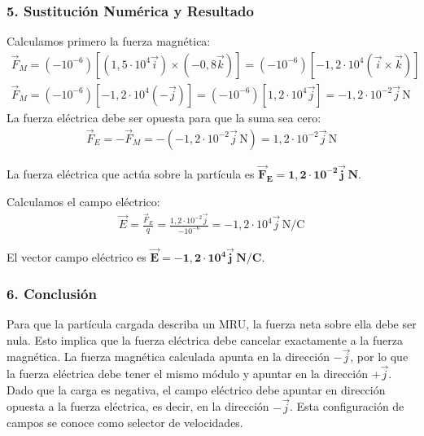 \subsubsection*{5. Sustitución Numérica y Resultado}
Calculamos primero la fuerza magnética:
\begin{gather}
    \vec{F}_M = (-10^{-6}) \left[ (1,5 \cdot 10^4 \vec{i}) \times (-0,8 \vec{k}) \right] = (-10^{-6}) [ -1,2 \cdot 10^4 (\vec{i} \times \vec{k}) ] \nonumber \\
    \vec{F}_M = (-10^{-6}) [ -1,2 \cdot 10^4 (-\vec{j}) ] = (-10^{-6}) [ 1,2 \cdot 10^4 \vec{j} ] = -1,2 \cdot 10^{-2} \vec{j} \, \text{N}
\end{gather}
La fuerza eléctrica debe ser opuesta para que la suma sea cero:
\begin{gather}
    \vec{F}_E = -\vec{F}_M = -(-1,2 \cdot 10^{-2} \vec{j} \, \text{N}) = 1,2 \cdot 10^{-2} \vec{j} \, \text{N}
\end{gather}
\begin{cajaresultado}
    La fuerza eléctrica que actúa sobre la partícula es $\boldsymbol{\vec{F}_E = 1,2 \cdot 10^{-2} \vec{j} \, N}$.
\end{cajaresultado}
\medskip
Calculamos el campo eléctrico:
\begin{gather}
    \vec{E} = \frac{\vec{F}_E}{q} = \frac{1,2 \cdot 10^{-2} \vec{j}}{-10^{-6}} = -1,2 \cdot 10^4 \vec{j} \, \text{N/C}
\end{gather}
\begin{cajaresultado}
    El vector campo eléctrico es $\boldsymbol{\vec{E} = -1,2 \cdot 10^4 \vec{j} \, N/C}$.
\end{cajaresultado}

\subsubsection*{6. Conclusión}
\begin{cajaconclusion}
    Para que la partícula cargada describa un MRU, la fuerza neta sobre ella debe ser nula. Esto implica que la fuerza eléctrica debe cancelar exactamente a la fuerza magnética. La fuerza magnética calculada apunta en la dirección $-\vec{j}$, por lo que la fuerza eléctrica debe tener el mismo módulo y apuntar en la dirección $+\vec{j}$. Dado que la carga es negativa, el campo eléctrico debe apuntar en dirección opuesta a la fuerza eléctrica, es decir, en la dirección $-\vec{j}$. Esta configuración de campos se conoce como selector de velocidades.
\end{cajaconclusion}

